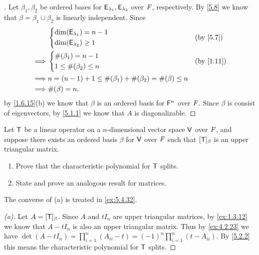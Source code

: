 \begin{proof}[]
  Let \(\beta_1, \beta_2\) be ordered bases for \(\mathsf{E}_{\lambda_1}, \mathsf{E}_{\lambda_2}\) over \(\mathit{F}\), respectively.
  By \cref{5.8} we know that \(\beta = \beta_1 \cup \beta_2\) is linearly independent.
  Since
  \begin{align*}
             & \begin{dcases}
                 \dim(\vs{E}_{\lambda_1}) = n - 1 \\
                 \dim(\vs{E}_{\lambda_2}) \geq 1
               \end{dcases}                               &  & \by{5.7}            \\
    \implies & \begin{dcases}
                 \#(\beta_1) = n - 1 \\
                 1 \leq \#(\beta_2) \leq n
               \end{dcases}                                         &  & \by{1.11} \\
    \implies & n = (n - 1) + 1 \leq \#(\beta_1) + \#(\beta_2) = \#(\beta) \leq n   \\
    \implies & \#(\beta) = n,
  \end{align*}
  by \cref{1.6.15}(b) we know that \(\beta\) is an ordered basis for \(\mathsf{F}^n\) over \(\mathit{F}\).
  Since \(\beta\) is consist of eigenvectors, by \cref{5.1.1} we know that \(A\) is diagonalizable.
\end{proof}

\begin{ex}\label{ex:5.2.9}
  Let \(\mathsf{T}\) be a linear operator on a \(n\)-dimensional vector space \(\mathsf{V}\) over \(\mathit{F}\), and suppose there exists an ordered basis \(\beta\) for \(\mathsf{V}\) over \(\mathit{F}\) such that \([\mathsf{T}]_{\beta}\) is an upper triangular matrix.
  \begin{enumerate}
    \item Prove that the characteristic polynomial for \(\mathsf{T}\) splits.
    \item State and prove an analogous result for matrices.
  \end{enumerate}
  The converse of (a) is treated in \cref{ex:5.4.32}.
\end{ex}

\begin{proof}[(a)]
  Let \(A = [\mathsf{T}]_{\beta}\).
  Since \(A\) and \(t I_n\) are upper triangular matrices, by \cref{ex:1.3.12} we know that \(A - t I_n\) is also an upper triangular matrix.
  Thus by \cref{ex:4.2.23} we have \(\det(A - t I_n) = \prod_{i = 1}^n (A_{i i} - t) = (-1)^n \prod_{i = 1}^n (t - A_{i i})\).
  By \cref{5.2.2} this means the characteristic polynomial for \(\mathsf{T}\) splits.
\end{proof}

